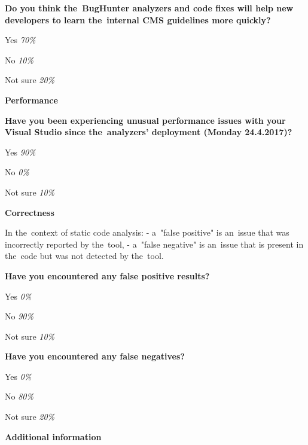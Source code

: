 \documentclass[
  digital, %
  table,   %
  lof,     %
  lot,     %
  oneside,
]{fithesis3}
\begin{document}
\smallskip\noindent
\textbf{Do you think the~BugHunter analyzers and code fixes will help new developers to learn the~internal CMS guidelines more quickly?}
\begin{compactitem}
\item Yes \textit{70\%}
\item No \textit{10\%}
\item Not sure \textit{20\%}
\end{compactitem}

\begin{center}
\textbf{Performance}
\end{center}

\smallskip\noindent
\textbf{Have you been experiencing unusual performance issues with your Visual Studio since the~analyzers' deployment (Monday 24.4.2017)?}
\begin{compactitem}
\item Yes \textit{90\%}
\item No \textit{0\%}
\item Not sure \textit{10\%}
\end{compactitem}

\begin{center}
\textbf{Correctness}
\end{center}

In the~context of static code analysis:
- a~"false positive" is an~issue that was incorrectly reported by the~tool,
- a~"false negative" is an~issue that is present in the~code but was not detected by the~tool.

\smallskip\noindent
\textbf{Have you encountered any false positive results?}
\begin{compactitem}
\item Yes \textit{0\%}
\item No \textit{90\%}
\item Not sure \textit{10\%}
\end{compactitem}

\smallskip\noindent
\textbf{Have you encountered any false negatives?}
\begin{compactitem}
\item Yes \textit{0\%}
\item No \textit{80\%}
\item Not sure \textit{20\%}
\end{compactitem}

\begin{center}
\textbf{Additional information}
\end{center}
\end{document}

